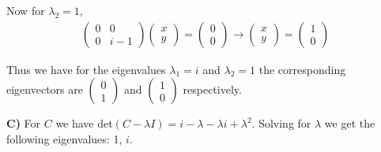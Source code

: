 \documentclass[12pt]{article}
\begin{document}
    Now for $\lambda_2 = 1$,
    \begin{align*}
        \begin{pmatrix}
            0 & 0 \\
            0 & i-1
        \end{pmatrix} \begin{pmatrix}x\\ y \end{pmatrix} = \begin{pmatrix}0 \\ 0 \end{pmatrix} \rightarrow\begin{pmatrix}x\\ y\end{pmatrix} =  \begin{pmatrix}1\\ 0 \end{pmatrix}
    \end{align*}

    Thus we have for the eigenvalues $\lambda_1 = i$ and $\lambda_2 = 1$ the corresponding eigenvectors are $\begin{pmatrix}0 \\ 1 \end{pmatrix}$ and $\begin{pmatrix}1\\ 0 \end{pmatrix}$ respectively. 

    \textbf{C)} For $C$ we have det$(C -\lambda I) = i - \lambda - \lambda i + \lambda^2$. Solving for $\lambda$ we get the following eigenvalues: 1, $i$.
\end{document}
